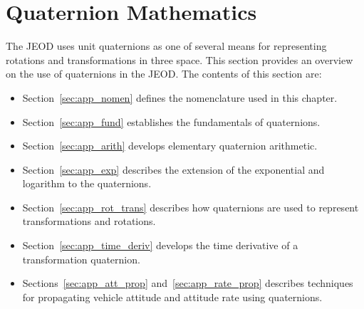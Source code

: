 %
%
% 


\chapter{Quaternion Mathematics}\label{sec:app_math}

The JEOD uses unit quaternions\cite{kuipers:2002} as one of several means
for representing rotations and transformations in three space.
This section provides an overview on the use of quaternions in the
JEOD.  The contents of this section are:
\begin{itemize}
\item Section~\ref{sec:app_nomen} defines the nomenclature used in this
chapter.
\item Section~\ref{sec:app_fund} establishes the fundamentals of
quaternions.
\item Section~\ref{sec:app_arith} develops elementary quaternion
arithmetic.
\item Section~\ref{sec:app_exp} describes the extension of the exponential
and logarithm
to the quaternions.
\item Section~\ref{sec:app_rot_trans} describes how quaternions are used to
represent transformations and rotations.
\item Section~\ref{sec:app_time_deriv} develops the time derivative of a
transformation quaternion.
\item Sections~\ref{sec:app_att_prop} and~\ref{sec:app_rate_prop}
describes techniques for propagating vehicle attitude and attitude rate
using quaternions.
\end{itemize}














